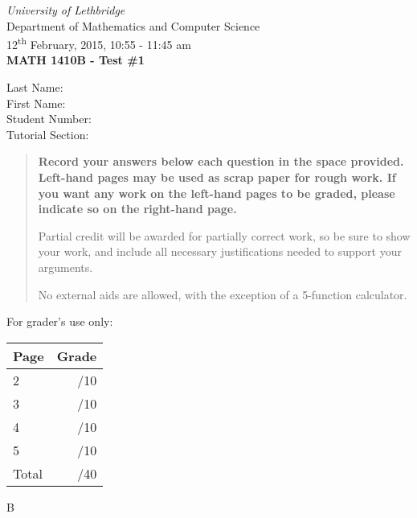 \documentclass[12pt]{article}
\newcommand{\skipline}{\vspace{12pt}}
\begin{document}
\author{Instructor: Sean Fitzpatrick}
\thispagestyle{plain}
\begin{center}
\emph{University of Lethbridge}\\
Department of Mathematics and Computer Science\\
12\textsuperscript{th} February, 2015, 10:55 - 11:45 am\\
{\bf MATH 1410B - Test \#1}\\
\end{center}
\skipline \skipline \skipline \noindent \skipline
Last Name:\underline{\hspace{353pt}}\\
\skipline
First Name:\underline{\hspace{350pt}}\\
\skipline
Student Number:\underline{\hspace{323pt}}\\
\skipline
Tutorial Section: \underline{\hspace{320pt}}\\


\vspace{0.5in}


\begin{quote}
 {\bf Record your answers below each question in the space provided.    Left-hand pages may be used as scrap paper for rough work.  If you want any work on the left-hand pages to be graded, please indicate so on the right-hand page.
 
 \bigskip
 
Partial credit will be awarded for partially correct work, so be sure to show your work, and include all necessary justifications needed to support your arguments.

\bigskip

No external aids are allowed, with the exception of a 5-function calculator.}
\end{quote}


\vspace{0.5in}

For grader's use only:

\begin{table}[hbt]
\begin{center}
\begin{tabular}{|l|r|} \hline
Page&Grade\\
\hline \hline
\cline{1-2} 2 & \enspace\enspace\enspace\enspace\enspace\enspace/10\\
\cline{1-2} 3 & \enspace\enspace\enspace\enspace\enspace\enspace/10\\
\cline{1-2} 4 & \enspace\enspace\enspace\enspace\enspace\enspace/10\\
\cline{1-2} 5 & \enspace\enspace\enspace\enspace\enspace\enspace/10\\
\cline{1-2} Total & \enspace\enspace\enspace\enspace\enspace\enspace/40\\
\hline
\end{tabular}

\skipline

\skipline

\skipline

B
\end{center}
\end{table}
\newpage
\end{document}
